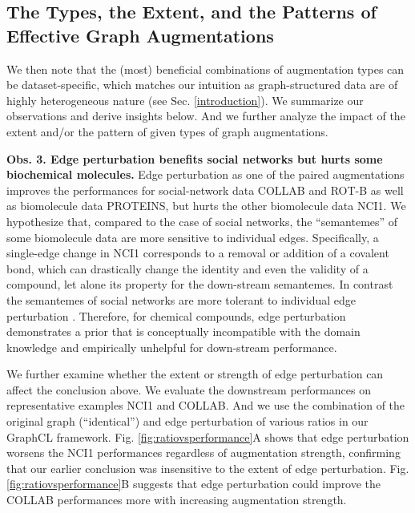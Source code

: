 \subsection{The Types, the Extent, and the Patterns of Effective Graph Augmentations}
We then note that the (most) beneficial combinations of augmentation types can be dataset-specific, which matches our intuition as  graph-structured data are of highly heterogeneous nature (see Sec. \ref{introduction}). We summarize our observations and derive insights below.  And we further analyze the impact of the extent and/or the pattern of given types of graph augmentations.   

\textbf{Obs. 3. Edge perturbation benefits social networks but hurts some  biochemical molecules.}
Edge perturbation as one of the paired augmentations improves  the performances for social-network data COLLAB and ROT-B as well as biomolecule data PROTEINS, but hurts the other biomolecule data NCI1. %
We hypothesize that, compared to the case of social networks, the ``semantemes'' of some biomolecule data are more sensitive to individual edges.   Specifically, a single-edge change in NCI1  corresponds to a removal or addition of a covalent bond, which can drastically change the identity and even the validity of a compound, let alone its property for the down-stream semantemes.  
In contrast the semantemes of social networks are more tolerant to individual edge perturbation \cite{dai2018adversarial,zugner2018adversarial}. Therefore, for chemical compounds, edge perturbation demonstrates a prior that is conceptually incompatible with the domain knowledge and empirically unhelpful for down-stream performance.

We further examine whether the extent or strength of edge perturbation can affect the conclusion above.  We evaluate the downstream performances on representative examples NCI1 and COLLAB.  And we use the combination of the original graph (``identical'') and edge perturbation of various ratios in our GraphCL framework. Fig. \ref{fig:ratiovsperformance}A shows that edge perturbation worsens the NCI1 performances regardless of augmentation strength, confirming that our earlier conclusion was insensitive to the extent of edge perturbation.  Fig. \ref{fig:ratiovsperformance}B suggests that edge perturbation could improve the COLLAB performances more with increasing augmentation strength.  

